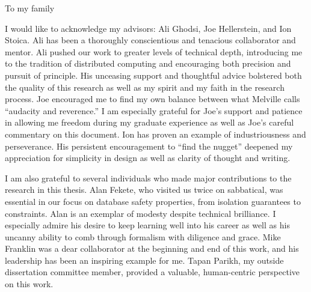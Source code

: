 \documentclass[12pt]{myucthesis}
\begin{document}
\hypersetup{pageanchor=true}
\begin{frontmatter}

\begin{dedication}
\null\vfil
{\large
\begin{center}
To my family
\end{center}}
\null\vfil
\end{dedication}

\tableofcontents
\listoffigures %
\listoftables %





\begin{acknowledgements}
\makeatletter
\let\@currsize\normalsize
\makeatother
{}
\setlength{\parskip}{.25\baselineskip}%

I would like to acknowledge my advisors: Ali Ghodsi, Joe
Hellerstein, and Ion Stoica. Ali has been a thoroughly conscientious
and tenacious collaborator and mentor. Ali pushed our work to greater
levels of technical depth, introducing me to the tradition of
distributed computing and encouraging both precision and pursuit of
principle. His unceasing support and thoughtful advice bolstered both
the quality of this research as well as my spirit and my faith in the
research process. Joe encouraged me to find my own balance between
what Melville calls ``audacity and reverence.'' I am especially
grateful for Joe's support and patience in allowing me freedom during
my graduate experience as well as Joe's careful commentary on this
document. Ion has proven an example of industriousness and
perseverance. His persistent encouragement to ``find the nugget''
deepened my appreciation for simplicity in design as well as clarity
of thought and writing.

I am also grateful to several individuals who made major contributions
to the research in this thesis. Alan Fekete, who visited us twice on sabbatical,
was essential in our focus on database safety properties, from
isolation guarantees to constraints. Alan is an exemplar of modesty
despite technical brilliance. I especially admire his desire to
keep learning well into his career as well as his uncanny ability to
comb through formalism with diligence and grace. Mike Franklin was a
dear collaborator at the beginning and end of this work, and his
leadership has been an inspiring example for me. Tapan Parikh, my
outside dissertation committee member, provided a valuable,
human-centric perspective on this work.


\end{acknowledgements}
\end{frontmatter}
\end{document}
